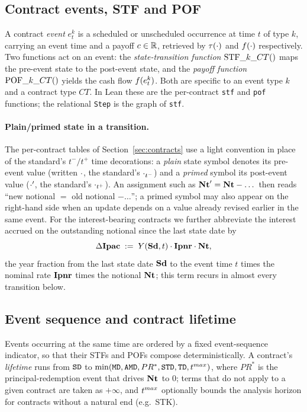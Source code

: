 \subsection{Contract events, STF and POF}
A contract \emph{event} $e_t^k$ is a scheduled or unscheduled occurrence at time
$t$ of type $k$, carrying an event time and a payoff $c\in\mathbb{R}$, retrieved by
$\tau(\cdot)$ and $f(\cdot)$ respectively.  Two functions act on an event:
the \emph{state-transition function} $\mathrm{STF}\_k\_CT()$ maps the pre-event state to
the post-event state, and the \emph{payoff function} $\mathrm{POF}\_k\_CT()$ yields the
cash flow $f(e_t^k)$.  Both are specific to an event type $k$ and a contract
type $CT$.  In Lean these are the per-contract \texttt{stf} and \texttt{pof}
functions; the relational \texttt{Step} is the graph of \texttt{stf}.

\paragraph{Plain/primed state in a transition.}
The per-contract tables of Section~\ref{sec:contracts} use a light convention in
place of the standard's $t^-/t^+$ time decorations: a \emph{plain} state symbol
denotes its pre-event value (written $\mathbf{\cdot}$, the standard's
$\mathbf{\cdot}_{t^-}$) and a \emph{primed} symbol its post-event value
($\mathbf{\cdot}'$, the standard's $\mathbf{\cdot}_{t^+}$).  An assignment such as
$\mathbf{Nt}'=\mathbf{Nt}-\dots$ then reads ``new notional $=$ old notional $-\dots$'';
a primed symbol may also appear on the right-hand side when an update depends on
a value already revised earlier in the same event.  For the interest-bearing
contracts we further abbreviate the interest accrued on the outstanding notional
since the last state date by
\[ \Delta\mathbf{Ipac} \;:=\; Y(\mathbf{Sd},t)\cdot\mathbf{Ipnr}\cdot\mathbf{Nt}, \]
the year fraction from the last state date $\mathbf{Sd}$ to the event time $t$ times
the nominal rate $\mathbf{Ipnr}$ times the notional $\mathbf{Nt}$; this term recurs in
almost every transition below.

\subsection{Event sequence and contract lifetime}
Events occurring at the same time are ordered by a fixed event-sequence
indicator, so that their STFs and POFs compose deterministically.  A contract's
\emph{lifetime} runs from $\texttt{SD}$ to
$\min(\texttt{MD},\texttt{AMD},PR^*,\texttt{STD},\texttt{TD},t^{max})$, where $PR^*$ is the
principal-redemption event that drives $\mathbf{Nt}_{}$ to $0$; terms that do not
apply to a given contract are taken as $+\infty$, and $t^{max}$ optionally bounds
the analysis horizon for contracts without a natural end (e.g.\ STK).

